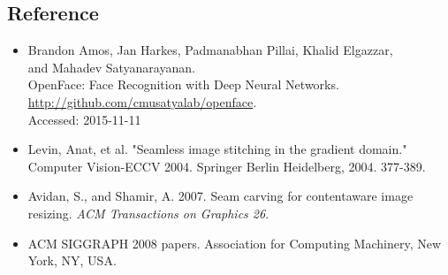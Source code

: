 \documentclass[12pt, a4paper, twocolumn]{article}
\begin{document}
\subsection{Reference }\label{header-n358}

\begin{itemize}
	\item
	Brandon Amos, Jan Harkes, Padmanabhan Pillai, Khalid Elgazzar,\\
	and Mahadev Satyanarayanan.\\
	OpenFace: Face Recognition with Deep Neural Networks.\\
	\url{http://github.com/cmusatyalab/openface}.\\
	Accessed: 2015-11-11
\end{itemize}

\begin{itemize}
	\item
	Levin, Anat, et al. "Seamless image stitching in the gradient domain."
	Computer Vision-ECCV 2004. Springer Berlin Heidelberg, 2004. 377-389.
	\item
	Avidan, S., and Shamir, A. 2007. Seam carving for contentaware image
	resizing. \emph{ACM Transactions on Graphics 26}.
\end{itemize}

\begin{itemize}
	\item
	ACM SIGGRAPH 2008 papers. Association for Computing Machinery, New
	York, NY, USA.
\end{itemize}
\end{document}
